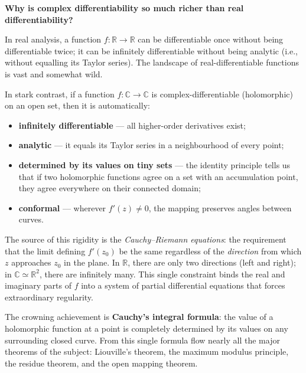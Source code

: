 \documentclass[12pt,a4paper,openany]{book}
\theoremstyle{definition}
\theoremstyle{plain}
\theoremstyle{remark}
\newcommand{\C}{\mathbb{C}}
\newcommand{\R}{\mathbb{R}}
\begin{document}
\medskip

\textbf{Why is complex differentiability so much richer than real differentiability?}

\medskip

In real analysis, a function $f:\R\to\R$ can be differentiable once without being differentiable twice; it can be infinitely differentiable without being analytic (i.e., without equalling its Taylor series). The landscape of real-differentiable functions is vast and somewhat wild.

In stark contrast, if a function $f:\C\to\C$ is complex-differentiable (holomorphic) on an open set, then it is automatically:
\begin{itemize}[leftmargin=2cm]
  \item \textbf{infinitely differentiable} --- all higher-order derivatives exist;
  \item \textbf{analytic} --- it equals its Taylor series in a neighbourhood of every point;
  \item \textbf{determined by its values on tiny sets} --- the identity principle tells us that if two holomorphic functions agree on a set with an accumulation point, they agree everywhere on their connected domain;
  \item \textbf{conformal} --- wherever $f'(z)\neq 0$, the mapping preserves angles between curves.
\end{itemize}

The source of this rigidity is the \emph{Cauchy--Riemann equations}: the requirement that the limit defining $f'(z_0)$ be the same regardless of the \emph{direction} from which $z$ approaches $z_0$ in the plane. In $\R$, there are only two directions (left and right); in $\C\simeq\R^2$, there are infinitely many. This single constraint binds the real and imaginary parts of $f$ into a system of partial differential equations that forces extraordinary regularity.

The crowning achievement is \textbf{Cauchy's integral formula}: the value of a holomorphic function at a point is completely determined by its values on any surrounding closed curve. From this single formula flow nearly all the major theorems of the subject: Liouville's theorem, the maximum modulus principle, the residue theorem, and the open mapping theorem.

\medskip
\end{document}
